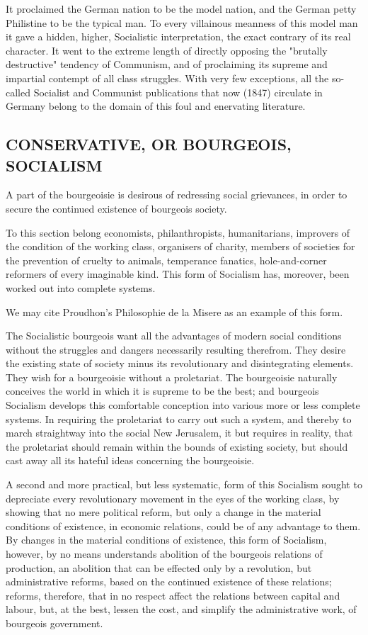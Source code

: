 \documentclass[, oneside]{article}   	%
\begin{document}
It proclaimed the German nation to be the model nation, and the German petty Philistine to be the typical man. To every villainous meanness of this model man it gave a hidden, higher, Socialistic interpretation, the exact contrary of its real character. It went to the extreme length of directly opposing the "brutally destructive" tendency of Communism, and of proclaiming its supreme and impartial contempt of all class struggles. With very few exceptions, all the so-called Socialist and Communist publications that now (1847) circulate in Germany belong to the domain of this foul and enervating literature.

\subsection{CONSERVATIVE, OR BOURGEOIS, SOCIALISM}
A part of the bourgeoisie is desirous of redressing social grievances, in order to secure the continued existence of bourgeois society.

To this section belong economists, philanthropists, humanitarians, improvers of the condition of the working class, organisers of charity, members of societies for the prevention of cruelty to animals, temperance fanatics, hole-and-corner reformers of every imaginable kind. This form of Socialism has, moreover, been worked out into complete systems.

We may cite Proudhon's Philosophie de la Misere as an example of this form.

The Socialistic bourgeois want all the advantages of modern social conditions without the struggles and dangers necessarily resulting therefrom. They desire the existing state of society minus its revolutionary and disintegrating elements. They wish for a bourgeoisie without a proletariat. The bourgeoisie naturally conceives the world in which it is supreme to be the best; and bourgeois Socialism develops this comfortable conception into various more or less complete systems. In requiring the proletariat to carry out such a system, and thereby to march straightway into the social New Jerusalem, it but requires in reality, that the proletariat should remain within the bounds of existing society, but should cast away all its hateful ideas concerning the bourgeoisie.

A second and more practical, but less systematic, form of this Socialism sought to depreciate every revolutionary movement in the eyes of the working class, by showing that no mere political reform, but only a change in the material conditions of existence, in economic relations, could be of any advantage to them. By changes in the material conditions of existence, this form of Socialism, however, by no means understands abolition of the bourgeois relations of production, an abolition that can be effected only by a revolution, but administrative reforms, based on the continued existence of these relations; reforms, therefore, that in no respect affect the relations between capital and labour, but, at the best, lessen the cost, and simplify the administrative work, of bourgeois government.
\end{document}
